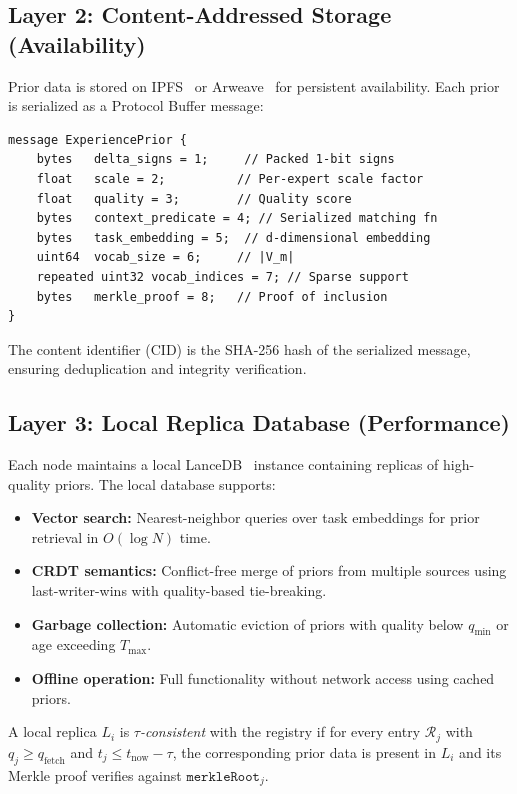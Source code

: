 \subsection{Layer 2: Content-Addressed Storage (Availability)}

Prior data is stored on IPFS~\cite{benet2014ipfs} or
Arweave~\cite{williams2019arweave} for persistent availability. Each prior is
serialized as a Protocol Buffer message:

\begin{verbatim}
message ExperiencePrior {
    bytes   delta_signs = 1;     // Packed 1-bit signs
    float   scale = 2;          // Per-expert scale factor
    float   quality = 3;        // Quality score
    bytes   context_predicate = 4; // Serialized matching fn
    bytes   task_embedding = 5;  // d-dimensional embedding
    uint64  vocab_size = 6;     // |V_m|
    repeated uint32 vocab_indices = 7; // Sparse support
    bytes   merkle_proof = 8;   // Proof of inclusion
}
\end{verbatim}

The content identifier (CID) is the SHA-256 hash of the serialized message,
ensuring deduplication and integrity verification.

\subsection{Layer 3: Local Replica Database (Performance)}

Each node maintains a local LanceDB~\cite{lancedb2024} instance containing
replicas of high-quality priors. The local database supports:

\begin{itemize}[leftmargin=1.5em]
    \item \textbf{Vector search:} Nearest-neighbor queries over task embeddings
          for prior retrieval in $O(\log N)$ time.
    \item \textbf{CRDT semantics:} Conflict-free merge of priors from multiple
          sources using last-writer-wins with quality-based tie-breaking.
    \item \textbf{Garbage collection:} Automatic eviction of priors with quality
          below $q_{\min}$ or age exceeding $T_{\max}$.
    \item \textbf{Offline operation:} Full functionality without network access
          using cached priors.
\end{itemize}

\begin{definition}
A local replica $L_i$ is \emph{$\tau$-consistent} with the registry if for
every entry $\mathcal{R}_j$ with $q_j \geq q_{\text{fetch}}$ and
$t_j \leq t_{\text{now}} - \tau$, the corresponding prior data is present in
$L_i$ and its Merkle proof verifies against $\texttt{merkleRoot}_j$.
\end{definition}

